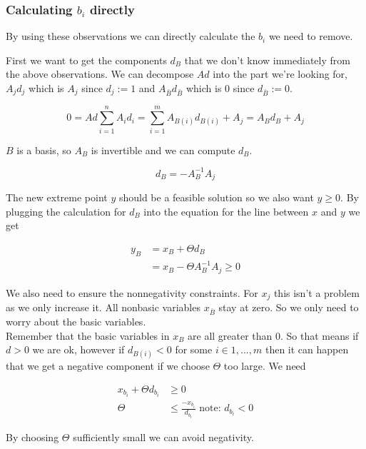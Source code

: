 \subsubsection*{Calculating $b_i$ directly}
By using these observations we can directly calculate the $b_i$ we need to remove.

First we want to get the components $d_B$ that we don't know immediately from the above observations. We can decompose $Ad$ into the part we're looking for, $A_j d_j$ which is $A_j$ since $d_j:=1$ and $A_{\bar B} d_{\bar B}$ which is 0 since $d_{\bar B}:=0$.

\[0= Ad \sum_{i=1}^{n}A_i d_i  = \sum_{i=1}^{m}{A_{B(i)} d_{B(i)}} + A_j = A_B d_B + A_j\]

$B$ is a basis, so $A_B$ is invertible and we can compute $d_B$.

\begin{equation}
d_B = -A^{-1}_B A_j \label{equ:valueDb}
\end{equation}

The new extreme point $y$ should be a feasible solution so we also want $y\geq 0$. By plugging the calculation for $d_B$ into the equation for the line between $x$ and $y$ we get

\begin{align*}
y_B &= x_B + \Theta d_B\\
 &= x_B - \Theta A_B^{-1} A_j \geq 0
\end{align*}

We also need to ensure the nonnegativity constraints. For $x_j$ this isn't a problem as we only increase it. All nonbasic variables $x_{\bar B}$ stay at zero. So we only need to worry about the basic variables. \\ 
Remember that the basic variables in $x_B$ are all greater than 0. 
So that means if $d>0$ we are ok, however if $d_{B(i)} <0$ for some $i \in {1,...,m}$ then it can happen that we get a negative component if we choose $\Theta$ too large. We need 

\begin{center}
\begin{align*}
x_{b_i} +\Theta d_{b_i} & \geq 0\\ %
\Theta &\leq \frac{-x_{b_i}}{d_{b_i}} \text{\ note: }d_{b_i}<0
\end{align*}
\end{center}

By choosing $\Theta$ sufficiently small we can avoid negativity. 

